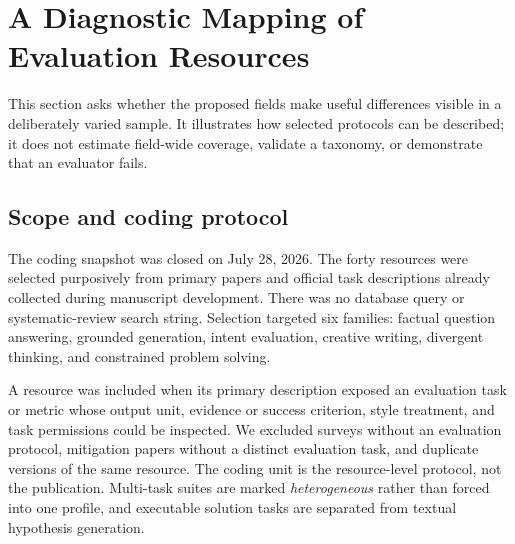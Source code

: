\documentclass{clv2025}
\begin{document}
\section{A Diagnostic Mapping of Evaluation Resources}\label{sec:audit}

This section asks whether the proposed fields make useful differences
visible in a deliberately varied sample.
It illustrates how selected protocols can be described; it does not
estimate field-wide coverage, validate a taxonomy, or demonstrate that an
evaluator fails.

\subsection{Scope and coding protocol}

The coding snapshot was closed on July 28, 2026.
The forty resources were selected purposively from primary papers and
official task descriptions already collected during manuscript
development.
There was no database query or systematic-review search string.
Selection targeted six families: factual question answering, grounded
generation, intent evaluation, creative writing, divergent thinking, and
constrained problem solving.

A resource was included when its primary description exposed an
evaluation task or metric whose output unit, evidence or success
criterion, style treatment, and task permissions could be inspected.
We excluded surveys without an evaluation protocol, mitigation papers
without a distinct evaluation task, and duplicate versions of the same
resource.
The coding unit is the resource-level protocol, not the publication.
Multi-task suites are marked \emph{heterogeneous} rather than forced into
one profile, and executable solution tasks are separated from textual
hypothesis generation.
\end{document}
